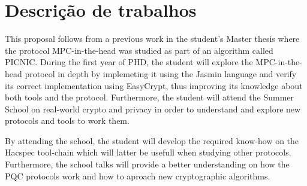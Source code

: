 \documentclass[preprint]{iacrtrans}
\begin{document}
\section*{Descrição de trabalhos}


\hspace{4mm} This proposal follows from a previous work in the student's Master thesis where the protocol MPC-in-the-head was studied as part of an algorithm called PICNIC.
During the first year of PHD, the student will explore the MPC-in-the-head protocol in depth by implemeting it using the Jasmin language and verify its correct implementation using EasyCrypt, thus improving its knowledge about both tools and the protocol. Furthermore, the student will attend the Summer School on real-world crypto and privacy in order to understand and explore new protocols and tools to work them.
\par By attending the school, the student will develop the required know-how on the Hacspec tool-chain which will latter be usefull when studying other protocols. Furthermore, the school talks will provide a better understanding on how the PQC protocols work and how to aproach new cryptographic algorithms.



















\printbibliography{}
\end{document}
